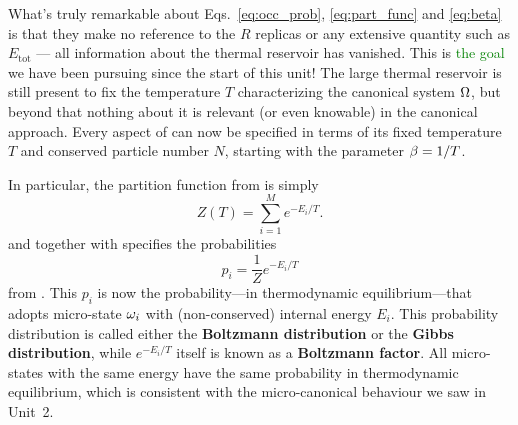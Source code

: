 What's truly remarkable about Eqs.~\ref{eq:occ_prob}, \ref{eq:part_func} and \ref{eq:beta} is that they make no reference to the $R$ replicas or any extensive quantity such as $E_{\text{tot}}$ --- all information about the thermal reservoir has vanished.
This is \textcolor{green}{the goal} we have been pursuing since the start of this unit!
The large thermal reservoir is still present to fix the temperature $T$ characterizing the canonical system $\Omega$, but beyond that nothing about it is relevant (or even knowable) in the canonical approach.
Every aspect of \Om can now be specified in terms of its fixed temperature $T$ and conserved particle number $N$, starting with the parameter $\beta = 1 / T$.

In particular, the partition function from  is simply
\begin{equation}
  \label{eq:canon_part_func}
  Z(T) = \sum_{i = 1}^M e^{-E_i / T}.
\end{equation}
and together with \be specifies the probabilities
\begin{equation}
  \label{eq:canon_prob}
  p_i = \frac{1}{Z} e^{-E_i / T}
\end{equation}
from .
This $p_i$ is now the probability---in thermodynamic equilibrium---that \Om adopts micro-state $\omega_i$ with (non-conserved) internal energy $E_i$.
This probability distribution is called either the \textbf{Boltzmann distribution} or the \textbf{Gibbs distribution}, while $e^{-E_i / T}$ itself is known as a \textbf{Boltzmann factor}.
All micro-states with the same energy have the same probability in thermodynamic equilibrium, which is consistent with the micro-canonical behaviour we saw in Unit~2.



